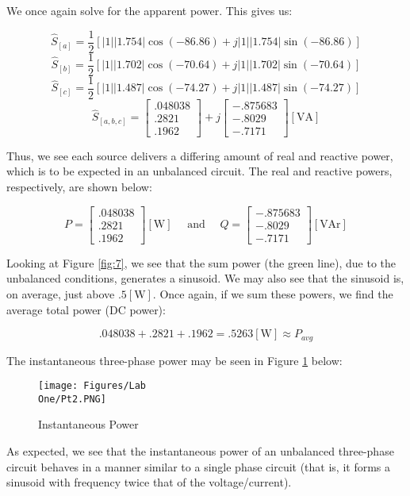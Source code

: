 \documentclass[
	letterpaper, %
	10pt, %
]{CSUniSchoolLabReport}
\begin{document}
  We once again solve for the apparent power. This gives us:

  $$\hat{S}_{[a]}=\frac{1}{2}\left[|1||1.754|\cos(-86.86)+j|1||1.754|\sin(-86.86)\right]$$
  $$\hat{S}_{[b]}=\frac{1}{2}\left[|1||1.702|\cos(-70.64)+j|1||1.702|\sin(-70.64)\right]$$
  $$\hat{S}_{[c]}=\frac{1}{2}\left[|1||1.487|\cos(-74.27)+j|1||1.487|\sin(-74.27)\right]$$
  $$\hat{S}_{[a,b,c]}=\left[ \begin{matrix} .048038\\ .2821\\ .1962\end{matrix} \right]+ j\left[ \begin{matrix} -.875683\\-.8029\\-.7171 \end{matrix} \right][\si{\volt\ampere}]$$

  Thus, we see each source delivers a differing amount of real and reactive power, which is to be expected in an unbalanced circuit. The real and reactive powers, respectively, are shown below:

  $$P=\left[ \begin{matrix} .048038\\ .2821\\ .1962\end{matrix} \right][\si{\watt}]\quad\text{ and }\quad Q=\left[ \begin{matrix} -.875683\\-.8029\\-.7171 \end{matrix} \right][\text{VAr}]$$

  Looking at Figure \ref{fig:7}, we see that the sum power (the green line), due to the unbalanced conditions, generates a sinusoid. We may also see that the sinusoid is, on average, just above $.5[\si{\watt}]$. Once again, if we sum these powers, we find the average total power (DC power):

  $$.048038+.2821+.1962=.5263[\si{\watt}]\approx P_{avg}$$

  The instantaneous three-phase power may be seen in Figure \ref{fig:6} below:

  \begin{figure}[H]
    \centering
    \texttt{[image: Figures/Lab\\ One/Pt2.PNG]}
    \caption{Instantaneous Power}
    \label{fig:6}
  \end{figure}

  As expected, we see that the instantaneous power of an unbalanced three-phase circuit behaves in a manner similar to a single phase circuit (that is, it forms a sinusoid with frequency twice that of the voltage/current).
\end{document}
